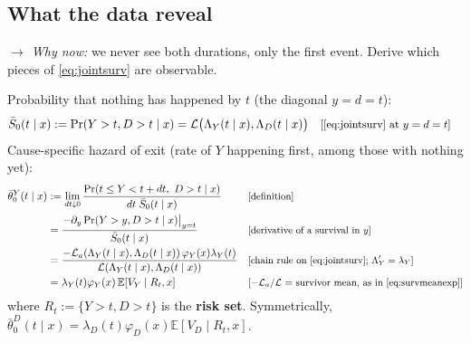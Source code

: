 \documentclass[11pt]{article}
\newcommand{\E}{\mathbb{E}}
\newcommand{\1}{\mathbf{1}}
\newcommand{\Lap}{\mathcal{L}}
\newcommand{\why}[1]{\text{\small[#1]}}
\newcommand{\whynow}[1]{\par\noindent\textit{$\rightarrow$ Why now:} #1\par}
\begin{document}
\subsection{What the data reveal}
\whynow{we never see both durations, only the first event. Derive which pieces of \eqref{eq:jointsurv} are observable.}
Probability that nothing has happened by $t$ (the diagonal $y=d=t$):
\begin{align}
  \bar S_0(t\mid x) := \Pr(Y>t,D>t\mid x) &= \Lap\big(\Lambda_Y(t\mid x),\Lambda_D(t\mid x)\big) && \why{\eqref{eq:jointsurv} at $y=d=t$} \label{eq:P0}
\end{align}
Cause-specific hazard of exit (rate of $Y$ happening first, among those with nothing yet):
\begin{align}
  \bar\theta^Y_0(t\mid x) &:= \lim_{dt\downarrow0}\frac{\Pr(t\le Y<t+dt,\ D>t\mid x)}{dt\;\bar S_0(t\mid x)} && \why{definition} \nonumber\\
  &= \frac{-\partial_y\Pr(Y>y,D>t\mid x)\big|_{y=t}}{\bar S_0(t\mid x)} && \why{derivative of a survival in $y$} \nonumber\\
  &= \frac{-\Lap_a(\Lambda_Y(t\mid x),\Lambda_D(t\mid x))\,\varphi_Y(x)\lambda_Y(t)}{\Lap(\Lambda_Y(t\mid x),\Lambda_D(t\mid x))} && \why{chain rule on \eqref{eq:jointsurv}; $\Lambda_Y'=\lambda_Y$} \nonumber\\
  &= \lambda_Y(t)\varphi_Y(x)\,\E[V_Y\mid R_t,x] && \why{$-\Lap_a/\Lap$ = survivor mean, as in \eqref{eq:survmeanexp}} \label{eq:hY}
\end{align}
where $R_t:=\{Y>t,D>t\}$ is the \textbf{risk set}. Symmetrically, $\bar\theta^D_0(t\mid x)=\lambda_D(t)\varphi_D(x)\E[V_D\mid R_t,x]$.
\end{document}
